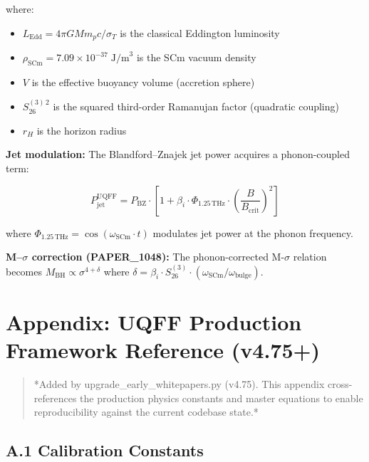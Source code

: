 \documentclass[12pt,a4paper]{article}
\begin{document}
where:

\begin{itemize}
  \item $L_{\text{Edd}} = 4\pi G M m_p c / \sigma_T$ is the classical Eddington luminosity
  \item $\rho_{\text{SCm}} = 7.09 \times 10^{-37}\;\text{J/m}^3$ is the SCm vacuum density
  \item $V$ is the effective buoyancy volume (accretion sphere)
  \item $S_{26}^{(3)\,2}$ is the squared third-order Ramanujan factor (quadratic coupling)
  \item $r_H$ is the horizon radius
\end{itemize}

\textbf{Jet modulation:} The Blandford--Znajek jet power acquires a phonon-coupled term:

\begin{equation}
P_{\text{jet}}^{\text{UQFF}} = P_{\text{BZ}} \cdot \left[1 + \beta_i \cdot \Phi_{1.25\,\text{THz}} \cdot \left(\frac{B}{B_{\text{crit}}}\right)^2\right]
\end{equation}

where $\Phi_{1.25\,\text{THz}} = \cos(\omega_{\text{SCm}} \cdot t)$ modulates jet power at the phonon frequency.

\textbf{M--$\sigma$ correction (PAPER\_1048):} The phonon-corrected M-$\sigma$ relation becomes $M_{\text{BH}} \propto \sigma^{4+\delta}$ where $\delta = \beta_i \cdot S_{26}^{(3)} \cdot (\omega_{\text{SCm}}/\omega_{\text{bulge}})$.

\section{Appendix: UQFF Production Framework Reference (v4.75+)}

\begin{quote}
*Added by upgrade\_{early\_whitepapers}.py (v4.75). This appendix cross-references
the production physics constants and master equations to enable reproducibility
against the current codebase state.*
\end{quote}

\subsection{A.1 Calibration Constants}
\end{document}
